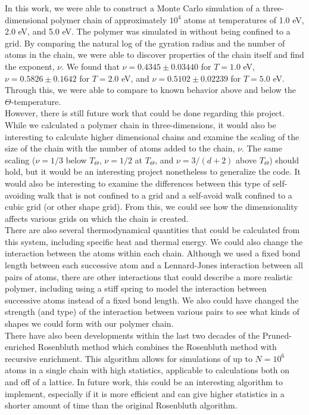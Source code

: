 \documentclass{article}
\begin{document}
\begin{multicols}{2}
In this work, we were able to construct a Monte Carlo simulation of a three-dimensional polymer chain of approximately $10^4$ atoms at temperatures of 1.0 eV, 2.0 eV, and 5.0 eV.  The polymer was simulated in without being confined to a grid.  By comparing the natural log of the gyration radius and the number of atoms in the chain, we were able to discover properties of the chain itself and find the exponent, $\nu$.  We found that $\nu = 0.4345 \pm 0.03440$ for $T = 1.0 $ eV, $\nu = 0.5826 \pm 0.1642$ for $T =2.0$ eV, and $\nu = 0.5102 \pm 0.02239$ for $T=5.0$ eV.  Through this, we were able to compare to known behavior above and below the $\Theta$-temperature.  \\

However, there is still future work that could be done regarding this project.  While we calculated a polymer chain in three-dimensions, it would also be interesting to calculate higher dimensional chains and examine the scaling of the size of the chain with the number of atoms added to the chain, $\nu$.  The same scaling ($\nu = 1/3$ below $T_\Theta$, $\nu = 1/2$ at $T_\Theta$, and $\nu = 3/(d+2)$ above $T_\Theta$) should hold, but it would be an interesting project nonetheless to generalize the code.  It would also be interesting to examine the differences between this type of self-avoiding walk that is not confined to a grid and a self-avoid walk confined to a cubic grid (or other shape grid).  From this, we could see how the dimensionality affects various grids on which the chain is created.  \\

There are also several thermodynamical quantities that could be calculated from this system, including specific heat and thermal energy.  We could also change the interaction between the atoms within each chain.  Although we used a fixed bond length between each successive atom and a Lennard-Jones interaction between all pairs of atoms, there are other interactions that could describe a more realistic polymer, including using a stiff spring to model the interaction between successive atoms instead of a fixed bond length.  We also could have changed the strength (and type) of the interaction between various pairs to see what kinds of shapes we could form with our polymer chain.  \\

There have also been developments within the last two decades of the Pruned-enriched Rosenbluth method which combines the Rosenbluth method with recursive enrichment.  This algorithm allows for simulations of up to $N=10^6$ atoms in a single chain with high statistics, applicable to calculations both on and off of a lattice.  \cite{PERM}  In future work, this could be an interesting algorithm to implement, especially if it is more efficient and can give higher statistics in a shorter amount of time than the original Rosenbluth algorithm.  \\


\end{multicols}
\end{document}
